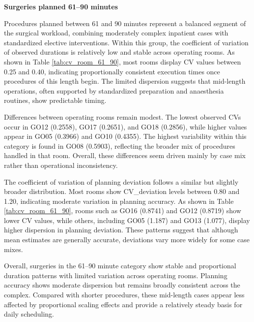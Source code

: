 \documentclass[
]{article}
\begin{document}
\vspace{1em}

\noindent\textbf{Surgeries planned 61–90 minutes} \vspace{0.5em}

Procedures planned between 61 and 90 minutes represent a balanced
segment of the surgical workload, combining moderately complex inpatient
cases with standardized elective interventions. Within this group, the
coefficient of variation of observed durations is relatively low and
stable across operating rooms. As shown in Table
\ref{tab:cv_room_61_90}, most rooms display CV values between 0.25 and
0.40, indicating proportionally consistent execution times once
procedures of this length begin. The limited dispersion suggests that
mid-length operations, often supported by standardized preparation and
anaesthesia routines, show predictable timing.

Differences between operating rooms remain modest. The lowest observed
CVs occur in GO12 (0.2558), GO17 (0.2651), and GO18 (0.2856), while
higher values appear in GO05 (0.3966) and GO10 (0.4355). The highest
variability within this category is found in GO08 (0.5903), reflecting
the broader mix of procedures handled in that room. Overall, these
differences seem driven mainly by case mix rather than operational
inconsistency.

The coefficient of variation of planning deviation follows a similar but
slightly broader distribution. Most rooms show CV\_deviation levels
between 0.80 and 1.20, indicating moderate variation in planning
accuracy. As shown in Table \ref{tab:cv_room_61_90}, rooms such as GO16
(0.8741) and GO12 (0.8719) show lower CV values, while others, including
GO05 (1.187) and GO13 (1.077), display higher dispersion in planning
deviation. These patterns suggest that although mean estimates are
generally accurate, deviations vary more widely for some case mixes.

Overall, surgeries in the 61--90 minute category show stable and
proportional duration patterns with limited variation across operating
rooms. Planning accuracy shows moderate dispersion but remains broadly
consistent across the complex. Compared with shorter procedures, these
mid-length cases appear less affected by proportional scaling effects
and provide a relatively steady basis for daily scheduling.
\end{document}
